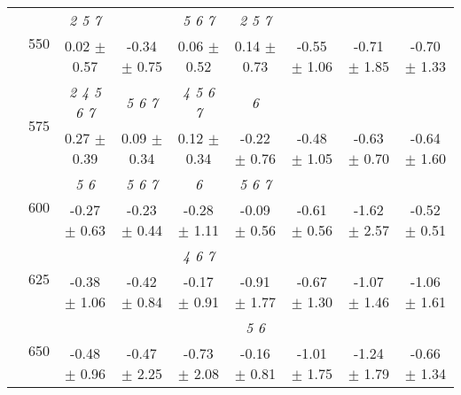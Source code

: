 \begin{table}[h]
{\begin{tabular}{
        ccccccccc}
 & \multirow{2}{*}{550}& \textit{ 2 5 7 }& & \textit{ 5 6 7 }& \textit{ 2 5 7 }& & &  \\ 
 & & 0.02 $\pm$ 0.57& -0.34 $\pm$ 0.75& 0.06 $\pm$ 0.52& 0.14 $\pm$ 0.73& -0.55 $\pm$ 1.06& -0.71 $\pm$ 1.85& -0.70 $\pm$ 1.33 \\ 
 & \multirow{2}{*}{575}& \cellcolor[HTML]{EFEFEF} \textit{ 2 4 5 6 7 }& \cellcolor[HTML]{EFEFEF} \textit{ 5 6 7 }& \cellcolor[HTML]{EFEFEF} \textit{ 4 5 6 7 }& \cellcolor[HTML]{EFEFEF} \textit{ 6 }& \cellcolor[HTML]{EFEFEF} & \cellcolor[HTML]{EFEFEF} & \cellcolor[HTML]{EFEFEF}  \\ 
 & & \cellcolor[HTML]{EFEFEF} 0.27 $\pm$ 0.39& \cellcolor[HTML]{EFEFEF} 0.09 $\pm$ 0.34& \cellcolor[HTML]{EFEFEF} 0.12 $\pm$ 0.34& \cellcolor[HTML]{EFEFEF} -0.22 $\pm$ 0.76& \cellcolor[HTML]{EFEFEF} -0.48 $\pm$ 1.05& \cellcolor[HTML]{EFEFEF} -0.63 $\pm$ 0.70& \cellcolor[HTML]{EFEFEF} -0.64 $\pm$ 1.60 \\ 
 & \multirow{2}{*}{600}& \textit{ 5 6 }& \textit{ 5 6 7 }& \textit{ 6 }& \textit{ 5 6 7 }& & &  \\ 
 & & -0.27 $\pm$ 0.63& -0.23 $\pm$ 0.44& -0.28 $\pm$ 1.11& -0.09 $\pm$ 0.56& -0.61 $\pm$ 0.56& -1.62 $\pm$ 2.57& -0.52 $\pm$ 0.51 \\ 
 & \multirow{2}{*}{625}& \cellcolor[HTML]{EFEFEF} & \cellcolor[HTML]{EFEFEF} & \cellcolor[HTML]{EFEFEF} \textit{ 4 6 7 }& \cellcolor[HTML]{EFEFEF} & \cellcolor[HTML]{EFEFEF} & \cellcolor[HTML]{EFEFEF} & \cellcolor[HTML]{EFEFEF}  \\ 
 & & \cellcolor[HTML]{EFEFEF} -0.38 $\pm$ 1.06& \cellcolor[HTML]{EFEFEF} -0.42 $\pm$ 0.84& \cellcolor[HTML]{EFEFEF} -0.17 $\pm$ 0.91& \cellcolor[HTML]{EFEFEF} -0.91 $\pm$ 1.77& \cellcolor[HTML]{EFEFEF} -0.67 $\pm$ 1.30& \cellcolor[HTML]{EFEFEF} -1.07 $\pm$ 1.46& \cellcolor[HTML]{EFEFEF} -1.06 $\pm$ 1.61 \\ 
 & \multirow{2}{*}{650}& & & & \textit{ 5 6 }& & &  \\ 
 & & -0.48 $\pm$ 0.96& -0.47 $\pm$ 2.25& -0.73 $\pm$ 2.08& -0.16 $\pm$ 0.81& -1.01 $\pm$ 1.75& -1.24 $\pm$ 1.79& -0.66 $\pm$ 1.34 \\ \midrule 

        \bottomrule
        \end{tabular}%
        }

        \end{table}
        
